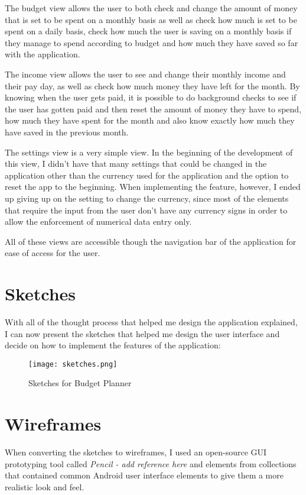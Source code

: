 The budget view allows the user to both check and change the amount of money that is set to be spent on a monthly basis as well as check how much is set to be spent on a daily basis, check how much the user is saving on a monthly basis if they manage to spend according to budget and how much they have saved so far with the application.

The income view allows the user to see and change their monthly income and their pay day, as well as check how much money they have left for the month. By knowing when the user gets paid, it is possible to do background checks to see if the user has gotten paid and then reset the amount of money they have to spend, how much they have spent for the month and also know exactly how much they have saved in the previous month.

The settings view is a very simple view. In the beginning of the development of this view, I didn't have that many settings that could be changed in the application other than the currency used for the application and the option to reset the app to the beginning. When implementing the feature, however, I ended up giving up on the setting to change the currency, since most of the elements that require the input from the user don't have any currency signs in order to allow the enforcement of numerical data entry only.

All of these views are accessible though the navigation bar of the application for ease of access for the user.

\section{Sketches}
With all of the thought process that helped me design the application explained, I can now present the sketches that helped me design the user interface and decide on how to implement the features of the application:

\begin{figure}
  \caption{Sketches for Budget Planner}
  \centering
  \texttt{[image: sketches.png]}
\end{figure}

\section{Wireframes}
When converting the sketches to wireframes, I used an open-source GUI prototyping tool called \emph{Pencil - add reference here} and elements from collections that contained common Android user interface elements to give them a more realistic look and feel.

